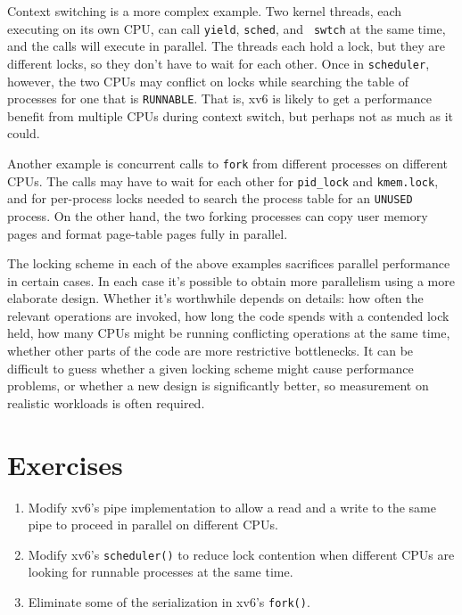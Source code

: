 Context switching is a more complex example. Two kernel threads, each
executing on its own CPU, can call {\tt yield}, {\tt sched}, and {\tt
  swtch} at the same time, and the calls will execute in parallel. The
threads each hold a lock, but they are different locks, so they don't
have to wait for each other. Once in {\tt scheduler}, however, the two
CPUs may conflict on locks while searching the table of processes for
one that is {\tt RUNNABLE}. That is, xv6 is likely to get a
performance benefit from multiple CPUs during context switch, but
perhaps not as much as it could.

Another example is concurrent calls to {\tt fork} from different
processes on different CPUs. The calls may have to wait for each other
for {\tt pid\_lock} and {\tt kmem.lock}, and for per-process locks
needed to search the process table for an {\tt UNUSED} process. On the
other hand, the two forking processes can copy user memory pages and
format page-table pages fully in parallel.

The locking scheme in each of the above examples sacrifices parallel
performance in certain cases. In each case it's possible to obtain
more parallelism using a more elaborate design. Whether it's
worthwhile depends on details: how often the relevant operations are
invoked, how long the code spends with a contended lock held, how many
CPUs might be running conflicting operations at the same time, whether
other parts of the code are more restrictive bottlenecks. It can be
difficult to guess whether a given locking scheme might cause
performance problems, or whether a new design is significantly better,
so measurement on realistic workloads is often required.

\section{Exercises}

\begin{enumerate}

\item Modify xv6's pipe implementation to allow a read and
  a write to the same pipe to proceed in parallel on different CPUs.

\item Modify xv6's \texttt{scheduler()} to reduce lock contention
  when different CPUs are looking for runnable processes at the same time.

\item Eliminate some of the serialization in xv6's \texttt{fork()}.

\end{enumerate}
